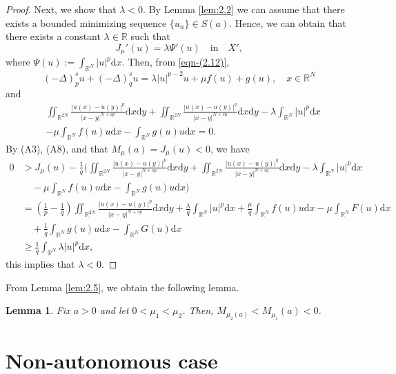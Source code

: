 \documentclass[10pt,a4paper]{amsart}
\numberwithin{equation}{section}
\newtheorem{lemma}[theorem]{Lemma}
\begin{document}
\begin{proof}
Next, we show that $\lambda<0$. By Lemma \ref{lem:2.2} we can assume that there 
exists a bounded minimizing sequence $\{u_n\}\in S(a)$.
Hence, we can obtain that there exists a constant $\lambda\in\mathbb{R}$ 
such that
\begin{equation}\label{eqn-(2.12)}
J_\mu'(u)=\lambda\Psi'(u)\quad  \text{in} \quad X',
\end{equation}
where $\Psi(u):=\int_{\mathbb{R}^N}|u|^{p}\mathrm{d}x$.
Then, from \eqref{eqn-(2.12)},
$$
(-\Delta)_p^{s} u+(-\Delta)_q^{s} u=\lambda |u|^{p-2}u+\mu f(u)+g(u),\quad
 x\in\mathbb{R}^N
$$
and
\begin{align*}
&\iint_{\mathbb{R}^{2N}}\frac{|u(x)-u(y)|^{p}}{|x-y|^{N+sp}}\mathrm{d}x\mathrm{d}y+\iint_{\mathbb{R}^{2N}}\frac{|u(x)-u(y)|^{q}}{|x-y|^{N+sq}}\mathrm{d}x\mathrm{d}y-\lambda \int_{\mathbb{R}^N} |u|^{p}\mathrm{d}x\\
&-\mu \int_{\mathbb{R}^N}f(u)u\mathrm{d}x-\int_{\mathbb{R}^N} g(u)u\mathrm{d}x=0.
\end{align*}
By (A3), (A8), and  that $M_\mu(a)=J_\mu(u)<0$,  we have
\begin{align*}
0&> J_\mu(u)-\frac{1}{q}(\iint_{\mathbb{R}^{2N}}
 \frac{|u(x)-u(y)|^{p}}{|x-y|^{N+sp}}\mathrm{d}x\mathrm{d}y
 +\iint_{\mathbb{R}^{2N}}\frac{|u(x)-u(y)|^{q}}{|x-y|^{N+sq}}\mathrm{d}x
 \mathrm{d}y-\lambda\int_{\mathbb{R}^N} |u|^{p}\mathrm{d}x\\
&\quad -\mu\int_{\mathbb{R}^N} f(u)u\mathrm{d}x-\int_{\mathbb{R}^N}g(u)u\mathrm{d}x)\\
&= (\frac{1}{p}-\frac{1}{q})\iint_{\mathbb{R}^{2N}}\frac{|u(x)-u(y)|^{p}}{|x-y|^{N+sp}}
 \mathrm{d}x\mathrm{d}y+\frac{\lambda}{q}\int_{\mathbb{R}^N} |u|^{p}\mathrm{d}x
 +\frac{\mu}{q} \int_{\mathbb{R}^N} f(u)u\mathrm{d}x-\mu\int_{\mathbb{R}^N}
 F(u)\mathrm{d}x\\
&\quad +\frac{1}{q}\int_{\mathbb{R}^N}g(u)u\mathrm{d}x-\int_{\mathbb{R}^N}
 G(u)\mathrm{d}x\\
&\geq \frac{1}{q}\int_{\mathbb{R}^N}\lambda |u|^{p}\mathrm{d}x,
\end{align*}
this implies that $\lambda<0$.
\end{proof}

From Lemma \ref{lem:2.5},  we obtain the following lemma.

\begin{lemma}\label{cor:2.1} 
Fix $a>0$ and let $0<\mu_1<\mu_2$.
Then, $M_{\mu_2(a)}<M_{\mu_1}(a)<0$.
\end{lemma}

\section{Non-autonomous case}
\end{document}
